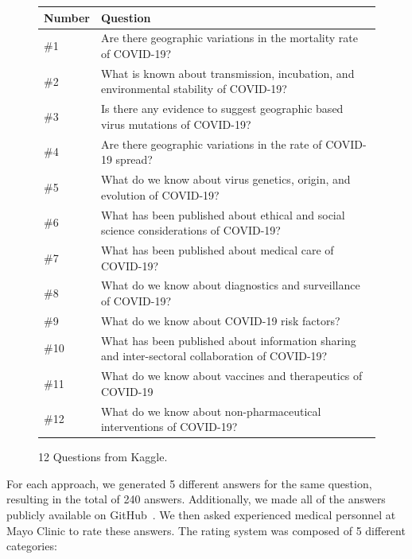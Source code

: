 \documentclass[sigconf,natbib=false]{acmart}
\begin{document}
\begin{figure}[H]
  \small
  \begin{tabular}{p{0.1\linewidth}p{0.9\linewidth}}
    \toprule
    Number & Question\\
    \midrule
    \#1 & Are there geographic variations in the mortality rate of COVID-19?\\
    \midrule
    \#2 & What is known about transmission, incubation, and environmental
      stability of COVID-19?\\
    \midrule
    \#3 & Is there any evidence to suggest geographic based virus mutations of
      COVID-19?\\
    \midrule
    \#4 & Are there geographic variations in the rate of COVID-19 spread?\\
    \midrule
    \#5 & What do we know about virus genetics, origin, and evolution of
      COVID-19?\\
    \midrule
    \#6 & What has been published about ethical and social science considerations
      of COVID-19?\\
    \midrule
    \#7 & What has been published about medical care of COVID-19?\\
    \midrule
    \#8 & What do we know about diagnostics and surveillance of COVID-19?\\
    \midrule
    \#9 & What do we know about COVID-19 risk factors?\\
    \midrule
    \#10 & What has been published about information sharing and inter-sectoral
      collaboration of COVID-19?\\
    \midrule
    \#11 & What do we know about vaccines and therapeutics of COVID-19\\
    \midrule
    \#12 & What do we know about non-pharmaceutical interventions of COVID-19?\\
    \bottomrule
  \end{tabular}
  \caption{12 Questions from Kaggle.}
\end{figure}

\noindent For each approach, we generated 5 different answers for the same
question, resulting in the total of 240 answers. Additionally, we made all of
the answers publicly available on GitHub~\cite{github-results}. We then asked
experienced medical personnel at Mayo Clinic to rate these answers. The rating
system was composed of 5 different categories:
\end{document}
